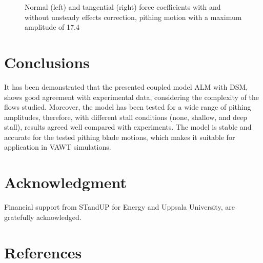 \documentclass[a4paper]{jpconf}
\begin{document}
\begin{figure}[h]
\begin{minipage}{18pc}
\resizebox{\columnwidth}{!}{}
\end{minipage}\hspace{2pc}%
\begin{minipage}{18pc}
\resizebox{\columnwidth}{!}{}
\end{minipage}
\caption{\label{AMP174corrections}Normal (left) and tangential (right) force coefficients with and without unsteady effects correction, pithing motion with a maximum amplitude of 17.4\degree\ }
\end{figure}


\section{Conclusions}

It has been demonstrated that the presented coupled model ALM with DSM, shows
good agreement with experimental data, considering the complexity of the flows
studied. Moreover, the model has been tested for a wide range of pithing
amplitudes, therefore, with different stall conditions (none, shallow, and deep
stall), results agreed well compared with experiments. The model is stable and
accurate for the tested pithing blade motions, which makes it suitable for
application in VAWT simulations.


\section*{Acknowledgment}
Financial support from STandUP for Energy and Uppsala University, are gratefully acknowledged.


\section*{References}

{}

\end{document}
